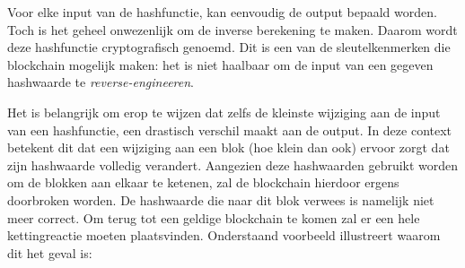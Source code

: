 Voor elke input van de hashfunctie, kan eenvoudig de output bepaald worden. Toch is het geheel onwezenlijk om de inverse berekening te maken. Daarom wordt deze hashfunctie cryptografisch genoemd. Dit is een van de sleutelkenmerken die blockchain mogelijk maken: het is niet haalbaar om de input van een gegeven hashwaarde te \textit{reverse-engineeren}. 

Het is belangrijk om erop te wijzen dat zelfs de kleinste wijziging aan de input van een hashfunctie, een drastisch verschil maakt aan de output. In deze context betekent dit dat een wijziging aan een blok (hoe klein dan ook) ervoor zorgt dat zijn hashwaarde volledig verandert. Aangezien deze hashwaarden gebruikt worden om de blokken aan elkaar te ketenen, zal de blockchain hierdoor ergens doorbroken worden. De hashwaarde die naar dit blok verwees is namelijk niet meer correct. Om terug tot een geldige blockchain te komen zal er een hele kettingreactie moeten plaatsvinden. Onderstaand voorbeeld illustreert waarom dit het geval is:

